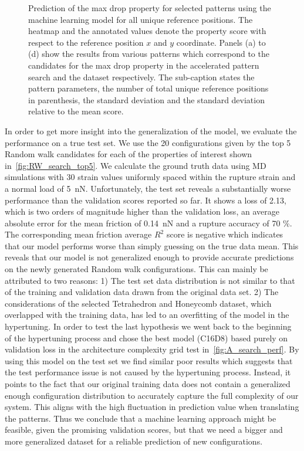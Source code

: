\begin{figure}[!htb]
\begin{subfigure}[t]{0.49\textwidth}
  \end{subfigure}
  \hfill
  \caption{Prediction of the max drop property for selected patterns using the machine learning model for all unique reference positions. The heatmap and the annotated values denote the property score with respect to the reference position $x$ and $y$ coordinate. Panels (a) to (d) show the results from various patterns which correspond to the candidates for the max drop property in the accelerated pattern search and the dataset respectively. The sub-caption states the pattern parameters, the number of total unique reference positions in parenthesis, the standard deviation and the standard deviation relative to the mean score. }
  \label{fig:ref_search_top_data}
\end{figure}


In order to get more insight into the generalization of the model, we evaluate
the performance on a true test set. We use the 20 configurations given by the
top 5 Random walk candidates for each of the properties of interest shown in~\cref{fig:RW_search_top5}. We calculate the ground truth data using \acrshort{MD}
simulations with 30 strain values uniformly spaced within the rupture
strain and a normal load of \SI{5}{nN}. Unfortunately, the test
set reveals a substantially worse performance than the validation scores
reported so far. It shows a loss of 2.13, which is two orders of magnitude
higher than the validation loss, an average absolute error for the mean
friction of \SI{0.14}{nN} and a rupture accuracy of 70 \%. The corresponding
mean friction average $R^2$ score is negative which indicates that our model
performs worse than simply guessing on the true data mean. This reveals that our
model is not generalized enough to provide accurate predictions on the newly
generated Random walk configurations. This can mainly be attributed to two
reasons: 1) The test set data distribution is not similar to that of the
training and validation data drawn from the original data set. 2) The
considerations of the selected Tetrahedron and Honeycomb dataset, which
overlapped with the training data, has led to an overfitting of the model in the
hypertuning. In order to test the last hypothesis we went back to the beginning
of the hypertuning process and chose the best model (C16D8) based purely on
validation loss in the architecture complexity grid
test in~\cref{fig:A_search_perf}. By using this model on the test set we find
similar poor results which suggests that the test performance issue is not
caused by the hypertuning process. Instead, it points to the fact that our
original training data does not contain a generalized enough configuration distribution to accurately capture the full complexity of our system. This aligns with the high
fluctuation in prediction value when translating the patterns. Thus we conclude
that a machine learning approach might be feasible, given the promising
validation scores, but that we need a bigger and more generalized dataset for a
reliable prediction of new configurations. 



